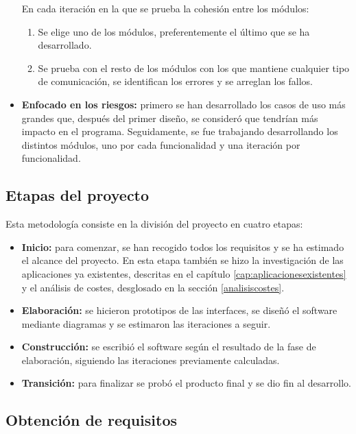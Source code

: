 \begin{itemize}
	En cada iteración en la que se prueba la cohesión entre los módulos:
	\begin{enumerate}
		\item Se elige uno de los módulos, preferentemente el último que se ha desarrollado.
		\item Se prueba con el resto de los módulos con los que mantiene cualquier tipo de comunicación, se identifican los errores y se arreglan los fallos.
	\end{enumerate}
	
	\item \textbf{Enfocado en los riesgos:} primero se han desarrollado los casos de uso más grandes que, después del primer diseño, se consideró que tendrían más impacto en el programa. Seguidamente, se fue trabajando desarrollando los distintos módulos, uno por cada funcionalidad y una iteración por funcionalidad.
	
\end{itemize}

\subsection{Etapas del proyecto}

Esta metodología consiste en la división del proyecto en cuatro etapas:
\begin{itemize}
    \item \textbf{Inicio:} para comenzar, se han recogido todos los requisitos y se ha estimado el alcance del proyecto. En esta etapa también se hizo la investigación de las aplicaciones ya existentes, descritas en el capítulo \ref{cap:aplicacionesexistentes} y el análisis de costes, desglosado en la sección \ref{analisiscostes}.
    \item \textbf{Elaboración:} se hicieron prototipos de las interfaces, se diseñó el software mediante diagramas y se estimaron las iteraciones a seguir.
    \item \textbf{Construcción:} se escribió el software según el resultado de la fase de elaboración, siguiendo las iteraciones previamente calculadas. 
    \item \textbf{Transición:} para finalizar se probó el producto final y se dio fin al desarrollo.
\end{itemize}

\subsection{Obtención de requisitos}
\label{sub:obtencionrequisitos}

